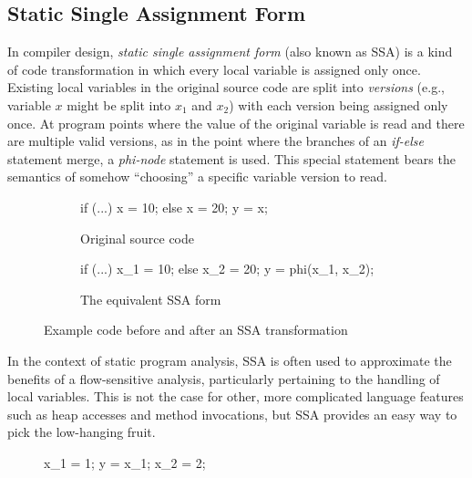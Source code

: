 \subsection{Static Single Assignment Form}

In compiler design, \emph{static single assignment form} (also known as SSA) is
a kind of code transformation in which every local variable is assigned only
once. Existing local variables in the original source code are split into
\emph{versions} (e.g., variable $x$ might be split into $x_1$ and $x_2$) with
each version being assigned only once. At program points where the value of the
original variable is read and there are multiple valid versions, as in the
point where the branches of an \emph{if-else} statement merge, a
\emph{phi-node} statement is used. This special statement bears the semantics
of somehow ``choosing'' a specific variable version to read.

\begin{figure}[h]
\begin{subfigure}{.45\textwidth}
    \begin{javacode}
    if (...) x = 10;
    else x = 20;
    y = x;
    \end{javacode}
    \caption{Original source code}
\end{subfigure}%
\hfill
\begin{subfigure}{.45\textwidth}
    \begin{javacode}
    if (...) x_1 = 10;
    else x_2 = 20;
    y = phi(x_1, x_2);
    \end{javacode}
    \caption{The equivalent SSA form}
\end{subfigure}
\caption{Example code before and after an SSA transformation}
\end{figure}

In the context of static program analysis, SSA is often used to approximate the
benefits of a flow-sensitive analysis, particularly pertaining to the handling
of local variables. This is not the case for other, more complicated language
features such as heap accesses and method invocations, but SSA provides an easy
way to pick the low-hanging fruit.

\setlength\intextsep{15pt}
\begin{figure}
    \centering
\begin{javacodeNoLines}
x_1 = 1;
y = x_1;
x_2 = 2;
\end{javacodeNoLines}
\end{figure}

